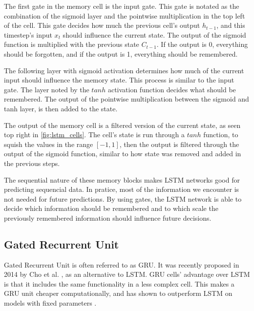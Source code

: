 The first gate in the memory cell is the input gate. This gate is notated as the combination of the sigmoid layer and the pointwise multiplication in the top left of the cell. This gate decides how much the previous cell's output $h_{t-1}$, and this timestep's input $x_t$ should influence the current state. The output of the sigmoid function is multiplied with the previous state $C_{t-1}$. If the output is 0, everything should be forgotten, and if the output is 1, everything should be remembered. 

The following layer with sigmoid activation determines how much of the current input should influence the memory state. This process is similar to the input gate. The layer noted by the $tanh$ activation function decides what should be remembered. The output of the pointwise multiplication between the sigmoid and tanh layer, is then added to the state.

The output of the memory cell is a filtered version of the current state, as seen top right in \ref{fig:lstm_cells}. The cell's state is run through a $tanh$ function, to squish the values in the range $[-1, 1]$, then the output is filtered through the output of the sigmoid function, similar to how state was removed and added in the previous steps. 

The sequential nature of these memory blocks makes LSTM networks good for predicting sequencial data. In pratice, most of the information we encounter is not needed for future predictions. By using gates, the LSTM network is able to decide which information should be remembered and to which scale the previously remembered information should influence future decisions. \cite{gers_learning_1999}\cite{_understanding_2015}

\subsection{Gated Recurrent Unit}


Gated Recurrent Unit is often referred to as GRU. It was recently proposed in 2014 by Cho et al. \cite{cho_learning_2014}, as an alternative to LSTM. GRU cells' advantage over LSTM is that it includes the same functionality in a less complex cell. This makes a GRU unit cheaper computationally, and has shown to outperform LSTM on models with fixed parameters \cite{chung_empirical_2014}. 

